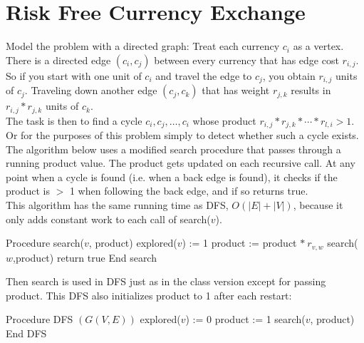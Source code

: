 \documentclass[11pt]{article}
\begin{document}
\section{Risk Free Currency Exchange}
Model the problem with a directed graph: Treat each currency $c_{i}$ as a vertex. There is a directed edge $(c_{i},c_{j})$ between every currency that has edge cost $r_{i,j}$. So if you start with one unit of $c_{i}$ and travel the edge to $c_{j}$, you obtain $r_{i,j}$ units of $c_{j}$. Traveling down another edge $(c_{j},c_{k})$ that has weight $r_{j,k}$ results in $r_{i,j} * r_{j,k}$ units of $c_{k}$. \\
The task is then to find a cycle $c_{i},c_{j},\dots,c_{i}$ whose product $r_{i,j} * r_{j,k} * \cdots * r_{l,i} > 1$. Or for the purposes of this problem simply to detect whether such a cycle exists. The algorithm below uses a modified search procedure that passes through a running product value. The product gets updated on each recursive call. At any point when a cycle is found (i.e. when a back edge is found), it checks if the product is $>$ 1 when following the back edge, and if so returns true. \\
This algorithm has the same running time as DFS, $O(|E| + |V|)$, because it only adds constant work to each call of search($v$). \\
\begin{algorithmic}
\STATE Procedure search($v$, product)
\STATE explored($v$) := 1
\STATE product := product $*\ r_{v,w}$
\STATE search($w$,product)
\ELSE
{}
\STATE return true 
\ENDIF
\ENDIF
\STATE End search
\end{algorithmic}
Then search is used in DFS just as in the class version except for passing product. This DFS also initializes product to 1 after each restart: \\
\begin{algorithmic}
\STATE Procedure DFS $(G(V,E))$
\STATE explored($v$) := 0
\ENDFOR
{}
\STATE product := 1
\STATE search($v$, product)
\ENDIF
\ENDFOR
\STATE End DFS
\end{algorithmic}
\end{document}
